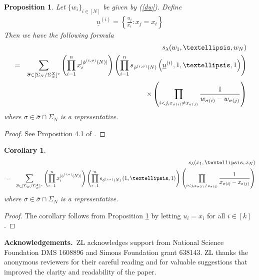 \documentclass[11pt]{amsart}
\theoremstyle{plain}
\newtheorem{proposition}[theorem]{Proposition}
\newtheorem{corollary}[theorem]{Corollary}
\theoremstyle{definition}
\theoremstyle{remark}
\newcommand\ol{\overline}
\numberwithin{equation}{section}
\numberwithin{theorem}{section}
\numberwithin{figure}{section}
\begin{document}
\begin{proposition}\label{p437}Let $\{w_i\}_{i\in[N]}$ be given by (\ref{dw}). 
Define
\begin{eqnarray*}
\underline{u}^{(i)}=\left\{\frac{u_j}{x_i}:x_j=x_i\right\}
\end{eqnarray*}
Then we have the following formula
\begin{eqnarray}
&&\label{sws}s_{\lambda}(w_1,\ldots,w_N)\\
&=&\sum_{\ol{\sigma}\in[\Sigma_N/\Sigma_N^X]^r} \left(\prod_{i=1}^{n}x_i^{|\phi^{(i,\sigma)}(N)|}\right)\left(\prod_{i=1}^{n}s_{\phi^{(i,\sigma)}(N)}\left(\underline{u}^{(i)},1,\ldots,1\right)\right)\notag\\
&&\times\left(\prod_{i<j,x_{\sigma(i)}\neq x_{\sigma(j)}}\frac{1}{w_{\sigma(i)}-w_{\sigma(j)}}\right)\notag
\end{eqnarray}
where $\sigma\in \ol{\sigma}\cap \Sigma_N$ is a representative. 
\end{proposition}

\begin{proof}See Proposition 4.1 of \cite{Li21}.
\end{proof}

\begin{corollary}\label{p438}
\begin{eqnarray}
&&\label{sws1}s_{\lambda}(x_1,\ldots,x_N)\\
&=&\sum_{\ol{\sigma}\in[\Sigma_N/\Sigma_N^X]^r} \left(\prod_{i=1}^{n}x_i^{|\phi^{(i,\sigma)}(N)|}\right)\left(\prod_{i=1}^{n}s_{\phi^{(i,\sigma)}(N)}\left(1,\ldots,1\right)\right)\left(\prod_{i<j,x_{\sigma(i)}\neq x_{\sigma(j)}}\frac{1}{x_{\sigma(i)}-x_{\sigma(j)}}\right)\notag
\end{eqnarray}
where $\sigma\in \ol{\sigma}\cap \Sigma_N$ is a representative. 
\end{corollary}

\begin{proof}The corollary follows from Proposition \ref{p437} by letting $u_i=x_i$ for all $i\in[k]$.
\end{proof}



\bigskip
\noindent\textbf{Acknowledgements.}\ ZL acknowledges support from National Science Foundation DMS 1608896 and Simons Foundation grant 638143. ZL thanks the anonymous reviewers for their careful reading and for valuable suggestions that improved the clarity and readability of the paper.





\end{document}
